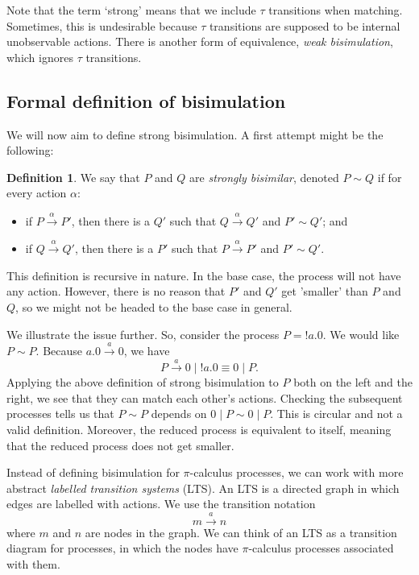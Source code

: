 \documentclass[a4paper, openany]{memoir}
\theoremstyle{definition}
\newtheorem{definition}[proposition]{Definition}
\begin{document}
    Note that the term `strong' means that we include $\tau$ transitions when matching. Sometimes, this is undesirable because $\tau$ transitions are supposed to be internal unobservable actions. There is another form of equivalence, \emph{weak bisimulation}, which ignores $\tau$ transitions.

    \subsection{Formal definition of bisimulation}
    We will now aim to define strong bisimulation. A first attempt might be the following:
    \begin{definition}
        We say that $P$ and $Q$ are \emph{strongly bisimilar}, denoted $P \sim Q$ if for every action $\alpha$:
        \begin{itemize}
            \item if $P \xrightarrow{\alpha} P'$, then there is a $Q'$ such that $Q \xrightarrow{\alpha} Q'$ and $P' \sim Q'$; and
            \item if $Q \xrightarrow{\alpha} Q'$, then there is a $P'$ such that $P \xrightarrow{\alpha} P'$ and $P' \sim Q'$.
        \end{itemize}
    \end{definition}
    This definition is recursive in nature. In the base case, the process will not have any action. However, there is no reason that $P'$ and $Q'$ get 'smaller' than $P$ and $Q$, so we might not be headed to the base case in general.

    We illustrate the issue further. So, consider the process $P = {!a.0}$. We would like $P \sim P$. Because $a.0 \xrightarrow{a} 0$, we have
    \[P \xrightarrow{a} 0 \mid {!a.0} \equiv 0 \mid P.\]
    Applying the above definition of strong bisimulation to $P$ both on the left and the right, we see that they can match each other's actions. Checking the subsequent processes tells us that $P \sim P$ depends on $0 \mid P \sim 0 \mid P$. This is circular and not a valid definition. Moreover, the reduced process is equivalent to itself, meaning that the reduced process does not get smaller.

    Instead of defining bisimulation for $\pi$-calculus processes, we can work with more abstract \emph{labelled transition systems} (LTS). An LTS is a directed graph in which edges are labelled with actions. We use the transition notation
    \[m \xrightarrow{a} n\]
    where $m$ and $n$ are nodes in the graph. We can think of an LTS as a transition diagram for processes, in which the nodes have $\pi$-calculus processes associated with them.
\end{document}
